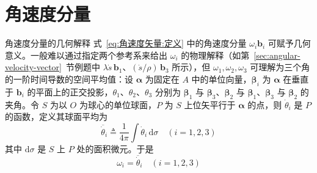 \section{角速度分量}\label{sec:angular-velocity-components}
\begin{myTheorem}{角速度分量的几何解释}
式~\eqref{eq:角速度矢量:定义} 中的角速度分量 $\omega_i\mathbf{b}_i$ 可赋予几何意义。一般难以通过指定两个参考系来给出 $\omega_i$ 的物理解释（如第~\ref{sec:angular-velocity-vector}~节例题中 $\lambda\dot{s}\,\mathbf{b}_1$、$(\dot{s}/\rho)\,\mathbf{b}_3$ 所示），但 $\omega_1,\omega_2,\omega_3$ 可理解为三个角的一阶时间导数的空间平均值：设 $\bm{\alpha}$ 为固定在 $A$ 中的单位向量，$\bm{\beta}_i$ 为 $\bm{\alpha}$ 在垂直于 $\mathbf{b}_i$ 的平面上的正交投影，$\theta_1$、$\theta_2$、$\theta_3$ 分别为 $\bm{\beta}_1$ 与 $\bm{\beta}_3$、$\bm{\beta}_2$ 与 $\bm{\beta}_1$、$\bm{\beta}_3$ 与 $\bm{\beta}_2$ 的夹角。令 $S$ 为以 $O$ 为球心的单位球面，$P$ 为 $S$ 上位矢平行于 $\bm{\alpha}$ 的点，则 $\dot{\theta}_i$ 是 $P$ 的函数，定义其球面平均为
\begin{equation}
    \overline{\dot{\theta}}_i \triangleq \frac{1}{4\pi}\int \dot{\theta}_i\,\mathrm{d}\sigma \quad (i=1,2,3)
    \label{eq:角速度分量:平均导数定义}
\end{equation}
其中 $\mathrm{d}\sigma$ 是 $S$ 上 $P$ 处的面积微元。于是
\begin{equation}
    \omega_i = \overline{\dot{\theta}}_i \quad (i=1,2,3)
    \label{eq:角速度分量:主要结论}
\end{equation}
\end{myTheorem}


